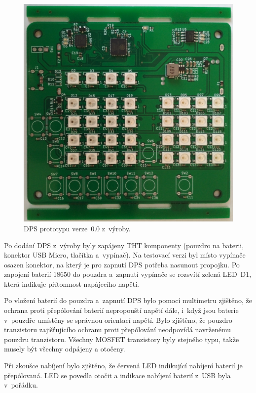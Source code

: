   \begin{figure}[!h]
    \begin{center}
      \includegraphics[scale=0.1]{obrazky/Verze0_vyroba_kolejnice.jpg}
    \end{center}
    \caption[DPS prototypu verze~0.0 z~výroby]{DPS prototypu verze~0.0 z~výroby.}
  \end{figure}

  Po dodání DPS z~výroby byly zapájeny THT komponenty (pouzdro na baterii, konektor USB Micro, tlačítka a~vypínač). Na testovací verzi
  byl místo vypínače osazen konektor, na který je pro zapnutí DPS potřeba nasunout propojku. Po zapojení baterií
  18650 do pouzdra a~zapnutí vypínače se rozsvítí zelená LED~D1, která indikuje přítomnost napájecího napětí. 

  Po vložení baterií do pouzdra a~zapnutí DPS bylo pomocí multimetru zjištěno, že ochrana proti přepólování baterií nepropouští napětí 
  dále, i~když jsou baterie v~pouzdře umístěny se správnou orientací napětí. Bylo zjištěno, že pouzdro tranzistoru zajišťujícího ochranu proti přepólování 
  neodpovídá navrženému pouzdru tranzistoru. Všechny MOSFET tranzistory byly stejného typu, takže musely být všechny odpájeny a otočeny.
  
  Při zkoušce nabíjení bylo zjištěno, že červená LED indikující nabíjení baterií je přepólovaná. LED se povedla otočit a indikace nabíjení 
  baterií z~USB byla v~pořádku. 
  
